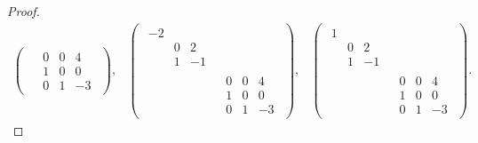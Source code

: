 \documentclass{./typewriter-math}
\begin{document}
\begin{exercise}[(DF 12.2.10)]
\begin{proof}
\[\begin{array}{ccc}
\begin{pmatrix}
						& \begin{matrix}
							0 & 0 & 4\\
							1 & 0 & 0\\
							0 & 1 & -3
						\end{matrix}
					\end{pmatrix},&
					\begin{pmatrix}
						\begin{matrix}
							-2 &   &  \\
							  & 0 & 2\\
							  & 1 & -1
						\end{matrix} & \\
						& \begin{matrix}
							0 & 0 & 4\\
							1 & 0 & 0\\
							0 & 1 & -3
						\end{matrix}
					\end{pmatrix},&
					\begin{pmatrix}
						\begin{matrix}
							1 &   &  \\
							  & 0 & 2\\
							  & 1 & -1
						\end{matrix} & \\
						& \begin{matrix}
							0 & 0 & 4\\
							1 & 0 & 0\\
							0 & 1 & -3
						\end{matrix}
					\end{pmatrix}.
				\end{array}%
			\]%
		\end{proof}
	\end{exercise}
\end{document}
